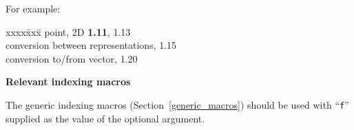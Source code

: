 \documentclass[11pt]{article}
\newenvironment{indexex}{\begin{tabbing}
xxxx\=xxx\=\kill}{\end{tabbing}}
\begin{document}
\begin{description}
        For example:
        \begin{indexex}
        point, 2D                                           {\bf 1.11},
                                                                 1.13 \\
        \>  conversion between representations,                  1.15 \\
        \>  conversion to/from vector,                           1.20\\
        \end{indexex}

   \item {\bf Relevant indexing macros}

         The generic indexing macros (Section~\ref{generic_macros}) should 
         be used with ``{\tt f}'' supplied as the value of the optional argument.

\end{description}
\end{document}
